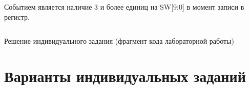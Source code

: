 \par{Событием является наличие 3 и более единиц на SW[9:0] в момент записи в регистр.}

%
\begin{listing}[H]
	\inputminted{SystemVerilog}{code_examples/lab_2/task_solution.sv}
	\caption{Решение индивидуального задания (фрагмент кода лабораторной работы)}
\end{listing}







\section{Варианты индивидуальных заданий}



